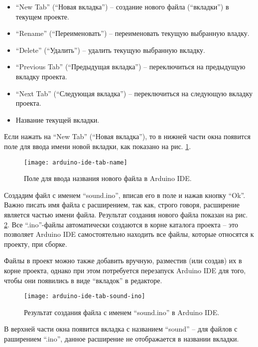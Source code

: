 \documentclass[../sparc.tex]{subfiles}
\begin{document}
\begin{itemize}
\item ``New Tab'' (``Новая вкладка'') -- создание нового файла (``вкладки'') в
  текущем проекте.
\item ``Rename'' (``Переименовать'') -- переименовать текущую выбранную владку.
\item ``Delete'' (``Удалить'') -- удалить текущую выбранную вкладку.
\item ``Previous Tab'' (``Предыдущая вкладка'') -- переключиться на предыдущую
  вкладку проекта.
\item ``Next Tab'' (``Следующая вкладка'') -- переключиться на следующую вкладку
  проекта.
\item Название текущей вкладки.
\end{itemize}

Если нажать на ``New Tab'' (``Новая вкладка''), то в нижней части окна появится
поле для ввода имени новой вкладки, как показано на
рис. \ref{fig:arduino-ide-tab-name}.

\begin{figure}[h]
  \centering
  \texttt{[image: arduino-ide-tab-name]}
  \caption{Поле для ввода названия нового файла в Arduino IDE.}
  \label{fig:arduino-ide-tab-name}
\end{figure}

Создадим файл с именем ``sound.ino'', вписав его в поле и нажав кнопку ``Ok''.
Важно писать имя файла с расширением, так как, строго говоря, расширение
является частью имени файла.  Результат создания нового файла показан на
рис. \ref{fig:arduino-ide-tab-sound-ino}.  Все ``.ino''-файлы автоматически
создаются в корне каталога проекта -- это позволяет Arduino IDE самостоятельно
находить все файлы, которые относятся к проекту, при сборке.

Файлы в проект можно также добавить вручную, разместив (или создав) их в корне
проекта, однако при этом потребуется перезапуск Arduino IDE для того, чтобы они
появились в виде ``вкладок'' в редакторе.

\begin{figure}[h]
  \centering
  \texttt{[image: arduino-ide-tab-sound-ino]}
  \caption{Результат создания файла с именем ``sound.ino'' в Arduino IDE.}
  \label{fig:arduino-ide-tab-sound-ino}
\end{figure}

В верхней части окна появится вкладка с названием ``sound'' -- для файлов с
раширением ``.ino'', данное расширение не отображается в названии вкладки.
\end{document}
